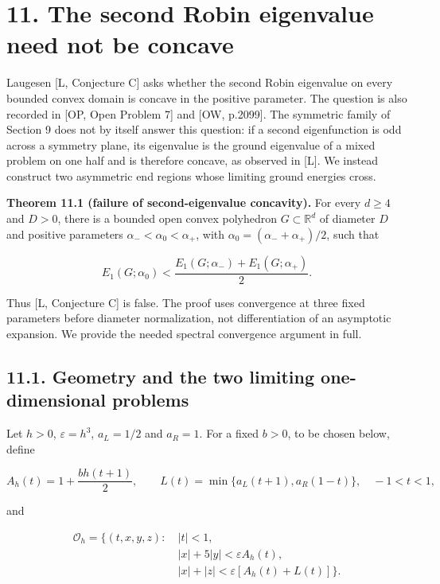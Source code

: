 \documentclass[11pt]{article}
\begin{document}
\section{11. The second Robin eigenvalue need not be
concave}\label{the-second-robin-eigenvalue-need-not-be-concave}

Laugesen {[}L, Conjecture C{]} asks whether the second Robin eigenvalue
on every bounded convex domain is concave in the positive parameter. The
question is also recorded in {[}OP, Open Problem 7{]} and {[}OW,
p.2099{]}. The symmetric family of Section 9 does not by itself answer
this question: if a second eigenfunction is odd across a symmetry plane,
its eigenvalue is the ground eigenvalue of a mixed problem on one half
and is therefore concave, as observed in {[}L{]}. We instead construct
two asymmetric end regions whose limiting ground energies cross.

\textbf{Theorem 11.1 (failure of second-eigenvalue concavity).} For
every \(d\ge4\) and \(D>0\), there is a bounded open convex polyhedron
\(G\subset\mathbb R^d\) of diameter \(D\) and positive parameters
\(\alpha_-<\alpha_0<\alpha_+\), with \(\alpha_0=(\alpha_-+\alpha_+)/2\),
such that

\[
E_1(G;\alpha_0)
<\frac{E_1(G;\alpha_-)+E_1(G;\alpha_+)}2.
\tag{11.1}
\]

Thus {[}L, Conjecture C{]} is false. The proof uses convergence at three
fixed parameters before diameter normalization, not differentiation of
an asymptotic expansion. We provide the needed spectral convergence
argument in full.

\subsection{11.1. Geometry and the two limiting one-dimensional
problems}\label{geometry-and-the-two-limiting-one-dimensional-problems}

Let \(h>0\), \(\varepsilon=h^3\), \(a_L=1/2\) and \(a_R=1\). For a fixed
\(b>0\), to be chosen below, define

\[
A_h(t)=1+\frac{bh(t+1)}2,
\qquad L(t)=\min\{a_L(t+1),a_R(1-t)\},
\quad -1<t<1,
\tag{11.2}
\]

and

\[
\begin{split}
\mathcal O_h=\{(t,x,y,z):\ &|t|<1,\\
&|x|+5|y|<\varepsilon A_h(t),\\
&|x|+|z|<\varepsilon[A_h(t)+L(t)]\}.
\end{split}
\tag{11.3}
\]
\end{document}
